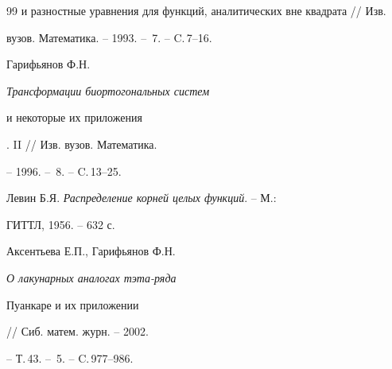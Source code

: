 \begin{thebibliography}{99}
{и разностные уравнения для функций, аналитических вне квадрата} // Изв.


вузов. Математика. -- 1993. -- \No\,7. -- C.\,7--16.




Гарифьянов Ф.Н. {\em Трансформации биортогональных систем


и некоторые их приложения}. II // Изв. вузов. Математика.


-- 1996. -- \No\,8. -- C.\,13--25.




Левин Б.Я. {\em Распределение корней целых функций}. -- М.:


ГИТТЛ, 1956. -- 632 с.




Аксентьева Е.П., Гарифьянов Ф.Н. {\em О лакунарных аналогах тэта-ряда


Пуанкаре и их приложении} // Сиб. матем. журн. -- 2002.


-- Т.\,43. -- \No\,5. -- C.\,977--986.





\end{thebibliography}





\vskip 2cm












\label{end}





